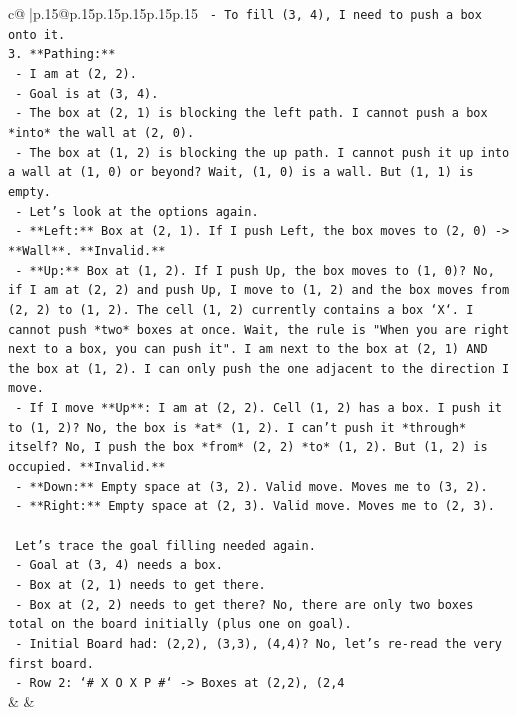 \documentclass{article}
\begin{document}
{\begin{supertabular}{c@{$\;$}|p{.15\linewidth}@{}p{.15\linewidth}p{.15\linewidth}p{.15\linewidth}p{.15\linewidth}p{.15\linewidth}}
{{{\texttt{    {-} To fill (3, 4), I need to push a box onto it.} \\
\texttt{3.  **Pathing:**} \\
\texttt{    {-} I am at (2, 2).} \\
\texttt{    {-} Goal is at (3, 4).} \\
\texttt{    {-} The box at (2, 1) is blocking the left path. I cannot push a box *into* the wall at (2, 0).} \\
\texttt{    {-} The box at (1, 2) is blocking the up path. I cannot push it up into a wall at (1, 0) or beyond? Wait, (1, 0) is a wall. But (1, 1) is empty.} \\
\texttt{    {-} Let's look at the options again.} \\
\texttt{    {-} **Left:** Box at (2, 1). If I push Left, the box moves to (2, 0) {-}> **Wall**. **Invalid.**} \\
\texttt{    {-} **Up:** Box at (1, 2). If I push Up, the box moves to (1, 0)? No, if I am at (2, 2) and push Up, I move to (1, 2) and the box moves from (2, 2) to (1, 2). The cell (1, 2) currently contains a box `X`. I cannot push *two* boxes at once. Wait, the rule is "When you are right next to a box, you can push it". I am next to the box at (2, 1) AND the box at (1, 2). I can only push the one adjacent to the direction I move.} \\
\texttt{    {-} If I move **Up**: I am at (2, 2). Cell (1, 2) has a box. I push it to (1, 2)? No, the box is *at* (1, 2). I can't push it *through* itself? No, I push the box *from* (2, 2) *to* (1, 2). But (1, 2) is occupied. **Invalid.**} \\
\texttt{    {-} **Down:** Empty space at (3, 2). Valid move. Moves me to (3, 2).} \\
\texttt{    {-} **Right:** Empty space at (2, 3). Valid move. Moves me to (2, 3).} \\
\\ 
\texttt{    Let's trace the goal filling needed again.} \\
\texttt{    {-} Goal at (3, 4) needs a box.} \\
\texttt{    {-} Box at (2, 1) needs to get there.} \\
\texttt{    {-} Box at (2, 2) needs to get there? No, there are only two boxes total on the board initially (plus one on goal).} \\
\texttt{    {-} Initial Board had: (2,2), (3,3), (4,4)? No, let's re{-}read the very first board.} \\
\texttt{      {-} Row 2: `\# X O X P \#` {-}> Boxes at (2,2), (2,4} \\
            }
        }
    }
    & & \\ \\


\end{supertabular}}
\end{document}
